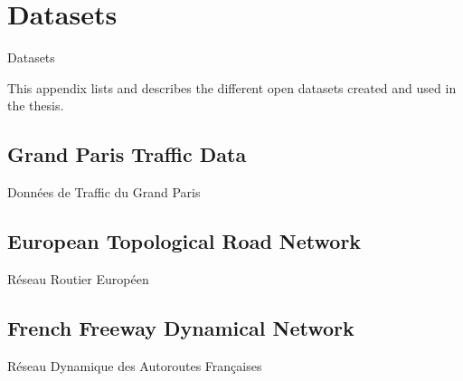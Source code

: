 \chapter{Datasets}{Datasets} %

\label{app:data} %



\headercit{}{}{}



This appendix lists and describes the different open datasets created and used in the thesis.


\section{Grand Paris Traffic Data}{Données de Traffic du Grand Paris}

% 


\section{European Topological Road Network}{Réseau Routier Européen}




\section{French Freeway Dynamical Network}{Réseau Dynamique des Autoroutes Françaises}




